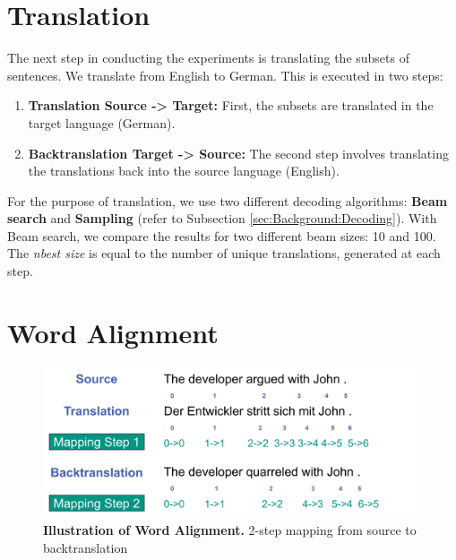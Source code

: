 \section{Translation}
\label{sec:Base_Experiment:Translation}

The next step in conducting the experiments is translating the subsets of sentences. We translate from English to German. This is executed in two steps:

\begin{enumerate}
    \item \textbf{Translation Source -> Target:} 
    First, the subsets are translated in the target language (German).
    \item \textbf{Backtranslation Target -> Source:}
    The second step involves translating the translations back into the source language (English).
\end{enumerate}

For the purpose of  translation, we use two different decoding algorithms: \textbf{Beam search} and \textbf{Sampling} (refer to Subsection \ref{sec:Background:Decoding}). With Beam search, we compare the results for two different beam sizes: 10 and 100. The \textit{nbest size} is equal to the number of unique translations, generated at each step. 

\section{Word Alignment}
\label{sec:Base_Experiment:Alignment}

\begin{figure}[!htb]
  \centering
  \includegraphics[scale=0.5]{figures/alignment.png}
  \caption[Illustration of Word Alignment]{\textbf{Illustration of Word Alignment.} 2-step mapping from source to backtranslation}
  \label{fig:alignment}
\end{figure}

